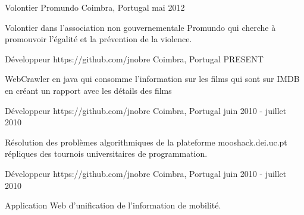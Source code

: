 


\begin{cventries}


\cventry
{Volontier} %
{Promundo} %
{Coimbra, Portugal} %
{mai 2012} %
{ %
\begin{cvitems}
\item {Volontier dans l’association non gouvernementale Promundo qui cherche à promouvoir l'égalité et la prévention de la violence. }
\end{cvitems}
}


\cventry
{Développeur} %
{https://github.com/jnobre} %
{Coimbra, Portugal} %
{PRESENT} %
{ %
\begin{cvitems}
\item {WebCrawler en java qui consomme l'information sur les films qui sont sur IMDB en créant un rapport avec les détails des films}
\end{cvitems}
}


\cventry
{Développeur} %
{https://github.com/jnobre} %
{Coimbra, Portugal} %
{juin 2010 - juillet 2010} %
{ %
\begin{cvitems}
\item {Résolution des problèmes algorithmiques de la plateforme mooshack.dei.uc.pt répliques des tournois universitaires de programmation.}
\end{cvitems}
}


\cventry
{Développeur} %
{https://github.com/jnobre} %
{Coimbra, Portugal} %
{juin 2010 - juillet 2010} %
{ %
\begin{cvitems}
\item {Application Web d'unification de l'information de mobilité.}
\end{cvitems}
}


\end{cventries}
